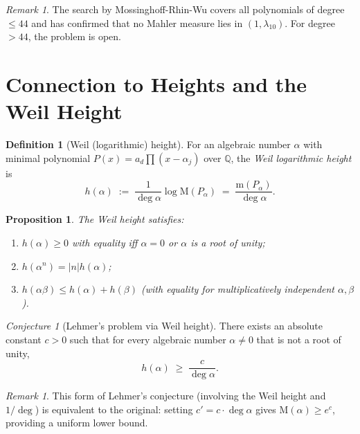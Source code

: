 \documentclass[12pt,a4paper]{amsart}
\newtheorem{proposition}[theorem]{Proposition}
\theoremstyle{definition}
\newtheorem{definition}[theorem]{Definition}
\theoremstyle{remark}
\newtheorem{remark}[theorem]{Remark}
\newtheorem{conjecture}[theorem]{Conjecture}
\newcommand{\Q}{\mathbb{Q}}
\newcommand{\M}{\mathrm{M}}
\newcommand{\m}{\mathrm{m}}
\DeclareMathOperator{\deg}{deg}
\begin{document}
\begin{remark}
  The search by Mossinghoff-Rhin-Wu \cite{MRW2008} covers all polynomials of degree
  $\leq 44$ and has confirmed that no Mahler measure lies in $(1, \lambda_{10})$.
  For degree $> 44$, the problem is open.
\end{remark}

\section{Connection to Heights and the Weil Height}\label{sec:heights}

\begin{definition}[Weil (logarithmic) height]
  For an algebraic number $\alpha$ with minimal polynomial $P(x) = a_d\prod(x-\alpha_j)$
  over $\Q$, the \emph{Weil logarithmic height} is
  \[
    h(\alpha) \;:=\; \frac{1}{\deg\alpha} \log \M(P_\alpha)
              \;=\; \frac{\m(P_\alpha)}{\deg\alpha}.
  \]
\end{definition}

\begin{proposition}
  The Weil height satisfies:
  \begin{enumerate}[label=(\roman*)]
    \item $h(\alpha) \geq 0$ with equality iff $\alpha = 0$ or $\alpha$ is a root of unity;
    \item $h(\alpha^n) = |n| h(\alpha)$;
    \item $h(\alpha\beta) \leq h(\alpha) + h(\beta)$ (with equality for multiplicatively
      independent $\alpha, \beta$).
  \end{enumerate}
\end{proposition}

\begin{conjecture}[Lehmer's problem via Weil height]\label{conj:lehmer_height}
  There exists an absolute constant $c > 0$ such that for every algebraic number
  $\alpha \neq 0$ that is not a root of unity,
  \[
    h(\alpha) \;\geq\; \frac{c}{\deg\alpha}.
  \]
\end{conjecture}

\begin{remark}
  This form of Lehmer's conjecture (involving the Weil height and $1/\deg$) is equivalent
  to the original: setting $c' = c \cdot \deg\alpha$ gives $\M(\alpha) \geq e^c$,
  providing a uniform lower bound.
\end{remark}
\end{document}
